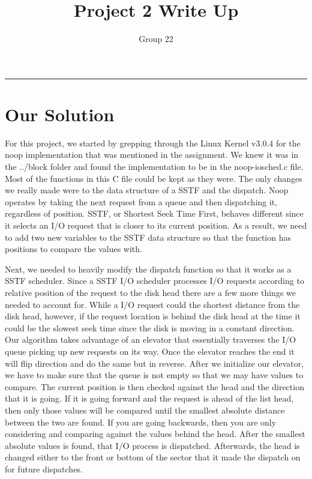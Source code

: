 \documentclass[letterpaper,10pt,notitlepage,fleqn]{article}
\title{Project 2 Write Up}
\author{Group 22}
\begin{document}
\maketitle
\hrule

\section*{Our Solution}
For this project, we started by grepping through the Linux Kernel v3.0.4 for the 
noop implementation that was mentioned in the assignment. We knew it was in the 
../block folder and found the implementation to be in the noop-iosched.c file. 
Most of the functions in this C file could be kept as they were. The only changes 
we really made were to the data structure of a SSTF and the dispatch. Noop operates 
by taking the next request from a queue and then dispatching it, regardless of 
position. SSTF, or Shortest Seek Time First, behaves different since it selects 
an I/O request that is closer to its current position. As a result, we need to 
add two new variables to the SSTF data structure so that the function has 
positions to compare the values with. 

Next, we needed to heavily modify the dispatch function so that it works as a 
SSTF scheduler. Since a SSTF I/O scheduler processes I/O requests according to 
relative position of the request to the disk head there are a few more things we needed to account for. While a I/O request could 
the shortest distance from the disk head, however, if the request location is behind the disk head at the time it could be 
the slowest seek time since the disk is moving in a constant direction. Our 
algorithm takes advantage of an elevator that essentially traverses the I/O 
queue picking up new requests on its way. Once the elevator reaches the 
end it will flip direction and do the same but in reverse. After we initialize our elevator, we have 
to make sure that the queue is not empty so that we may have values to compare. 
The current position is then checked against the head and the direction that it 
is going. If it is going forward and the request is ahead of the list head, then 
only those values will be compared until the smallest absolute distance between 
the two are found. If you are going backwards, then you are only considering and 
comparing against the values behind the head. After the smallest absolute values 
is found, that I/O process is dispatched. Afterwards, the head is changed either 
to the front or bottom of the sector that it made the dispatch on for future 
dispatches. 
\end{document}
